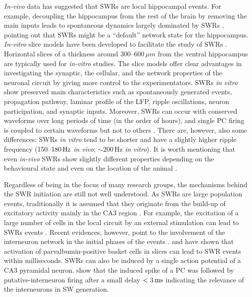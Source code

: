     \textit{In-vivo} data has suggested that SWRs are local hippocampal events.
    For example, decoupling the hippocampus from the rest of the brain by
    removing the main inputs leads to spontaneous dynamics largely dominated by
    SWRs \citep{Buzsaki1983}, pointing out that SWRs might be a ``default''
    network state for the hippocampus. \textit{In-vitro} slice models have been
    developed to facilitate the study of SWRs \cite[e.g.,][]{Maier2002, Maier2003,
    Kubota2003, Colgin2004}. Horizontal slices of a thickness around 300--$600\,
    \mu m$ from the ventral hippocampus are typically used for \textit{in-vitro}
    studies. The slice models offer clear advantages in investigating the
    synaptic, the cellular, and the network properties of the neuronal circuit
    by giving more control to the experimentators. SWRs \textit{in vitro} show
    preserved main characteristics such as spontaneously generated events,
    propagation pathway, laminar profile of the LFP, ripple oscillations,
    neuron participation, and synaptic inputs. Moreover, SWRs can occur with
    conserved waveforms over long periods of time (in the order of hours), and
    single PC firing is coupled to certain waveforms but not to others
    \citep{Reichinnek2010}. There are, however, also some differences: SWRs
    \textit{in vitro} tend to be shorter and have a slightly higher ripple
    frequency (150--$180 \,\rm Hz$ \textit{in vivo}; $\sim 200$\,\rm Hz \textit{in
    vitro}). It is worth mentioning that even \textit{in-vivo} SWRs show
    slightly different properties depending on the behavioural state and even on
    the location of the animal \citep{Buzsaki2015}.
    
    Regardless of being in the focus of many research groups, the mechanisms
    behind the SWR initiation are still not well understood. As SWRs are large
    population events, traditionally it is assumed that they originate from the
    build-up of excitatory activity mainly in the CA3 region
    \citep{Ellender2010, Schlingloff2014, Hulse2016}. For
    example, the excitation of a large number of cells in the local circuit by
    an external stimulation can lead to SWRs events \citep{Maier2003, Behrens2005,
    Nimmrich2005, Both2008}. Recent evidences, however, point to the
    involvement of the interneuron network in the initial phases of the events
    \citep{Sasaki2014, Bazelot2016}. \cite{Schlingloff2014} and
    \cite{Kohus2016} have shown that activation of parvalbumin-positive basket
    cells in slices can lead to SWR events within milliseconds. SWRs can also
    be induced by a single action potential of a CA3 pyramidal neuron.
    \cite{Bazelot2016} show that the induced spike of a PC was followed by
    putative-interneuron firing after a small delay $<3\,\rm ms$ indicating the
    relevance of the interneurons in SW generation.

